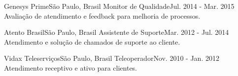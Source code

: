     \resumeSubheading
      {Genesys Prime}{São Paulo, Brasil}
      {Monitor de Qualidade}{Jul. 2014 - Mar. 2015}
      \resumeItemListStart
          {Avaliação de atendimento e feedback para melhoria de processos.}
      \resumeItemListEnd

    \resumeSubheading
      {Atento Brasil}{São Paulo, Brasil}
      {Assistente de Suporte}{Mar. 2012 - Jul. 2014}
      \resumeItemListStart
          {Atendimento e solução de chamados de suporte ao cliente.}
      \resumeItemListEnd

    \resumeSubheading
      {Vidax Teleserviços}{São Paulo, Brasil}
      {Teleoperador}{Nov. 2010 - Jan. 2012}
      \resumeItemListStart
          {Atendimento receptivo e ativo para clientes.}
      \resumeItemListEnd

  \resumeSubHeadingListEnd